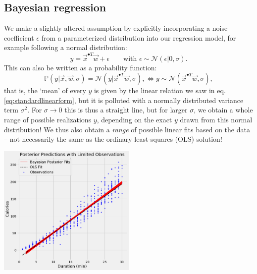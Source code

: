 \documentclass{article}
\begin{document}
\subsection{Bayesian regression}
We make a slightly altered assumption by explicitly incorporating  a noise coefficient $\epsilon$ from a parameterized distribution into our regression model, for example following a normal distribution:
\begin{equation}
    y = \vec{x}^{\bullet T}\vec{w} + \epsilon\quad\quad\text{with }\epsilon \sim \mathcal{N}(\epsilon|0,\sigma).
\end{equation}
This can also be written as a probability function:
\begin{equation}
    \mathbb{P}(y|\vec{x},\vec{w},\sigma) = \mathcal{N}(y|\vec{x}^{\bullet T}\vec{w},\sigma), \Longleftrightarrow y \sim \mathcal{N}(\vec{x}^{\bullet T}\vec{w},\sigma),\label{eq:drawingy}
\end{equation}
that is, the `mean' of every $y$ is given by the linear relation we saw in eq. \eqref{eq:standardlinearform}, but it is polluted with a normally distributed variance term $\sigma^2$. For $\sigma\to 0$ this is thus a straight line, but for larger $\sigma$, we obtain a whole range of possible realizations $y$, depending on the exact $y$ drawn from this normal distribution! We thus also obtain a \textit{range} of possible linear fits based on the data -- not necessarily the same as the ordinary least-squares (OLS) solution!
\begin{center}\includegraphics[width=0.5\textwidth]{bayeslinearregression.png}\end{center}
\end{document}
